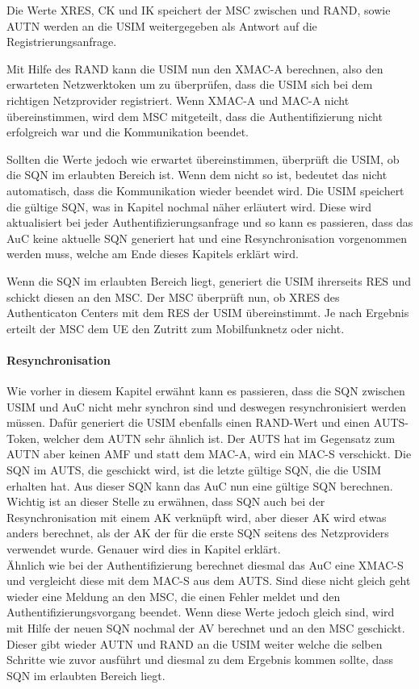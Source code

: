  Die Werte XRES, CK und IK speichert der MSC zwischen und RAND, sowie AUTN werden an die USIM
 weitergegeben als Antwort auf die Registrierungsanfrage.

 Mit Hilfe des RAND kann die USIM nun den XMAC-A berechnen, also den erwarteten Netzwerktoken um
 zu überprüfen, dass die USIM sich bei dem richtigen Netzprovider registriert. Wenn XMAC-A
 und MAC-A nicht übereinstimmen, wird dem MSC mitgeteilt, dass die Authentifizierung nicht erfolgreich
 war und die Kommunikation beendet.

 Sollten die Werte jedoch wie erwartet übereinstimmen, überprüft die USIM, ob die SQN im erlaubten
 Bereich ist. Wenn dem nicht so ist, bedeutet das nicht automatisch, dass die Kommunikation wieder
 beendet wird. Die USIM speichert die gültige SQN, was in Kapitel 
 nochmal näher erläutert wird. Diese wird aktualisiert bei jeder Authentifizierungsanfrage und so kann
 es passieren, dass das AuC keine aktuelle SQN generiert hat und eine Resynchronisation vorgenommen
 werden muss, welche am Ende dieses Kapitels erklärt wird.
 
 Wenn die SQN im erlaubten Bereich liegt, generiert die USIM ihrerseits RES und schickt diesen an
 den MSC. Der MSC überprüft nun, ob XRES des Authenticaton Centers mit dem RES der USIM
 übereinstimmt. Je nach Ergebnis erteilt der MSC dem \ac{UE} den Zutritt zum Mobilfunknetz oder
 nicht.
 
 \paragraph{Resynchronisation}
 \label{par:resynchronisation}
  Wie vorher in diesem Kapitel erwähnt kann es passieren, dass die SQN zwischen USIM und AuC
  nicht mehr synchron sind und deswegen resynchronisiert werden müssen. Dafür generiert die
  USIM ebenfalls einen RAND-Wert und einen AUTS-Token, welcher dem AUTN sehr ähnlich ist.
  Der AUTS hat im Gegensatz zum AUTN aber keinen AMF und statt dem MAC-A, wird ein MAC-S
  verschickt. Die SQN im AUTS, die geschickt wird, ist die letzte gültige SQN, die die USIM erhalten
  hat. Aus dieser SQN kann das AuC nun eine gültige SQN berechnen. Wichtig ist an dieser
  Stelle zu erwähnen, dass SQN auch bei der Resynchronisation mit einem AK verknüpft wird,
  aber dieser AK wird etwas anders berechnet, als der AK der für die erste SQN seitens des
  Netzproviders verwendet wurde. Genauer wird dies in Kapitel 
  erklärt.\\
  Ähnlich wie bei der Authentifizierung berechnet diesmal das AuC eine XMAC-S und vergleicht
  diese mit dem MAC-S aus dem AUTS. Sind diese nicht gleich geht wieder eine Meldung an den
  MSC, die einen Fehler meldet und den Authentifizierungsvorgang beendet. Wenn diese Werte
  jedoch gleich sind, wird mit Hilfe der neuen SQN nochmal der AV berechnet und an den MSC
  geschickt. Dieser gibt wieder AUTN und RAND an die USIM weiter welche die selben Schritte
  wie zuvor ausführt und diesmal zu dem Ergebnis kommen sollte, dass SQN im erlaubten
  Bereich liegt.
  
